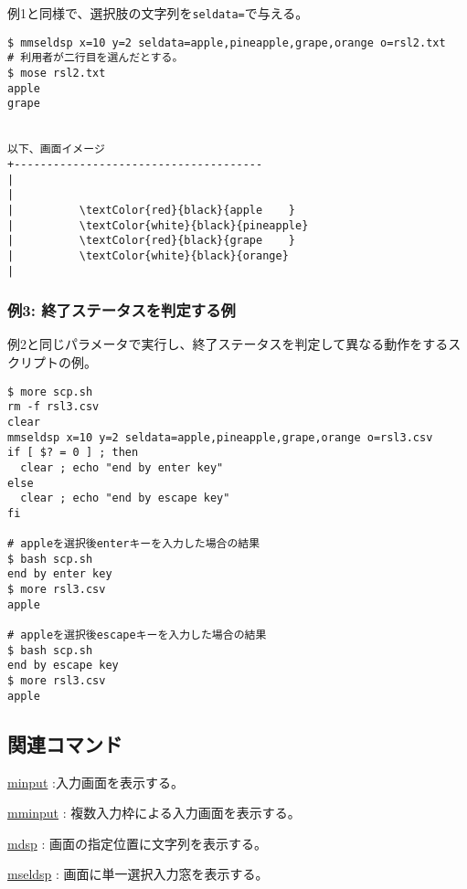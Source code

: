 例1と同様で、選択肢の文字列を\verb|seldata=|で与える。

\begin{Verbatim}[baselinestretch=0.7,frame=single,commandchars=\\\{\}]
$ mmseldsp x=10 y=2 seldata=apple,pineapple,grape,orange o=rsl2.txt
# 利用者が二行目を選んだとする。
$ mose rsl2.txt
apple
grape


以下、画面イメージ
+--------------------------------------
|
|
|          \textColor{red}{black}{apple    }
|          \textColor{white}{black}{pineapple}
|          \textColor{red}{black}{grape    }
|          \textColor{white}{black}{orange}
|
\end{Verbatim}

\subsubsection*{例3: 終了ステータスを判定する例}

例2と同じパラメータで実行し、終了ステータスを判定して異なる動作をするスクリプトの例。

\begin{Verbatim}[baselinestretch=0.7,frame=single]
$ more scp.sh
rm -f rsl3.csv
clear
mmseldsp x=10 y=2 seldata=apple,pineapple,grape,orange o=rsl3.csv
if [ $? = 0 ] ; then
  clear ; echo "end by enter key"
else
  clear ; echo "end by escape key"
fi

# appleを選択後enterキーを入力した場合の結果
$ bash scp.sh
end by enter key
$ more rsl3.csv
apple

# appleを選択後escapeキーを入力した場合の結果
$ bash scp.sh
end by escape key
$ more rsl3.csv
apple
\end{Verbatim}

\subsection*{関連コマンド}
\hyperref[sect:minput] {minput} :入力画面を表示する。

\hyperref[sect:mminput] {mminput} : 複数入力枠による入力画面を表示する。

\hyperref[sect:mdsp] {mdsp} : 画面の指定位置に文字列を表示する。

\hyperref[sect:mseldsp] {mseldsp} : 画面に単一選択入力窓を表示する。


%
